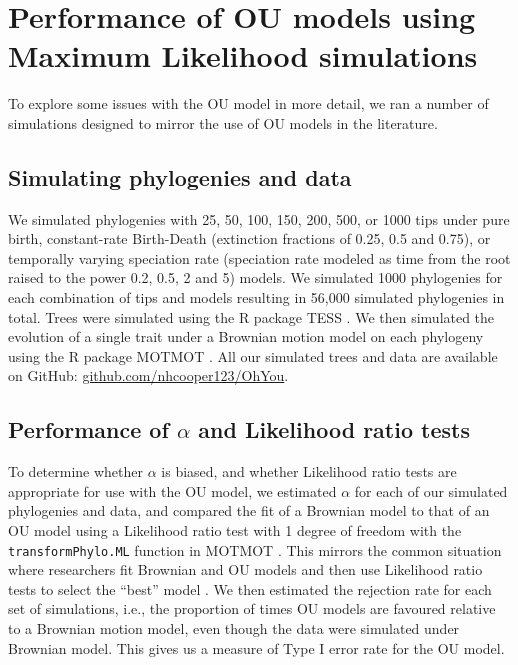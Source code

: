 \documentclass[a4paper,12pt]{article}
\begin{document}
\section{Performance of OU models using Maximum Likelihood simulations}
  To explore some issues with the OU model in more detail, we ran a number of simulations designed to mirror the use of OU models in the literature.

  \subsection{Simulating phylogenies and data}
    We simulated phylogenies with 25, 50, 100, 150, 200, 500, or 1000 tips under pure birth, constant-rate Birth-Death (extinction fractions of 0.25, 0.5 and 0.75), or temporally varying speciation rate (speciation rate modeled as time from the root raised to the power 0.2, 0.5, 2 and 5) models. 
    We simulated 1000 phylogenies for each combination of tips and models resulting in 56,000 simulated phylogenies in total. 
    Trees were simulated using the R package TESS \cite{hohna2013fast}. 
    We then simulated the evolution of a single trait under a Brownian motion model on each phylogeny using the R package MOTMOT \citep{Thomas:2011aa}. 
    All our simulated trees and data are available on GitHub: \href{https://github.com/nhcooper123/OhYou}{github.com/nhcooper123/OhYou}.

  \subsection{Performance of $\alpha$ and Likelihood ratio tests}
    To determine whether $\alpha$ is biased, and whether Likelihood ratio tests are appropriate for use with the OU model, we estimated $\alpha$ for each of our simulated phylogenies and data, and compared the fit of a Brownian model to that of an OU model using a Likelihood ratio test with 1 degree of freedom with the \texttt{transformPhylo.ML} function in MOTMOT \citep{Thomas:2011aa}. 
    This mirrors the common situation where researchers fit Brownian and OU models and then use Likelihood ratio tests to select the ``best'' model \citep{}. %
    We then estimated the rejection rate for each set of simulations, i.e., the proportion of times OU models are favoured relative to a Brownian motion model, even though the data were simulated under Brownian model. This gives us a measure of Type I error rate for the OU model.
\end{document}
